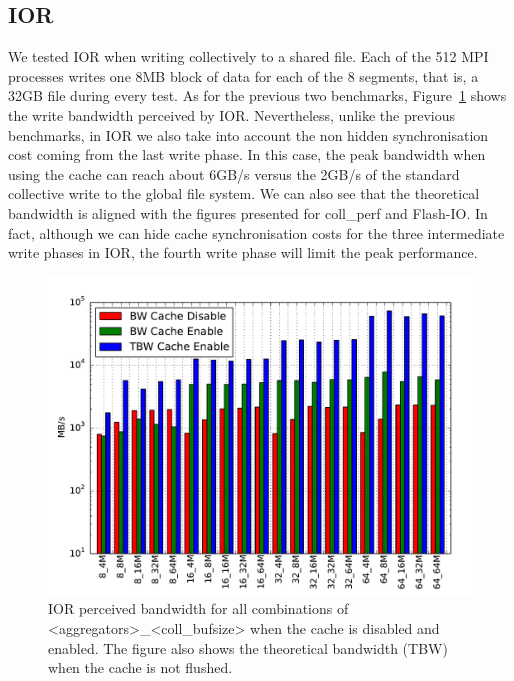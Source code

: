 \subsection{IOR}
\label{subsec: ior}
We tested IOR when writing collectively to a shared file. Each of the 512 MPI processes writes one 8MB block of data for each of the 8 segments, that is, a 32GB file during every test.
As for the previous two benchmarks, Figure~\ref{figure: ior-bw} shows the write bandwidth perceived by IOR. Nevertheless, unlike the previous benchmarks, in IOR we also take into account the non hidden synchronisation cost coming from the last write phase. In this case, the peak bandwidth when using the cache can reach about 6GB/s versus the 2GB/s of the standard collective write to the global file system. We can also see that the theoretical bandwidth is aligned with the figures presented for coll\_perf and Flash-IO. In fact, although we can hide cache synchronisation costs for the three intermediate write phases in IOR, the fourth write phase will limit the peak performance.
\begin{figure}[htb]
  \centering
  \includegraphics[width=0.9\columnwidth]{figures/ior_32GB_30sec_bw}
  \caption{IOR perceived bandwidth for all combinations of <aggregators>\_<coll\_bufsize> when the cache is disabled and enabled. The figure also shows the theoretical bandwidth (TBW) when the cache is not flushed.}
  \label{figure: ior-bw}
\end{figure}
